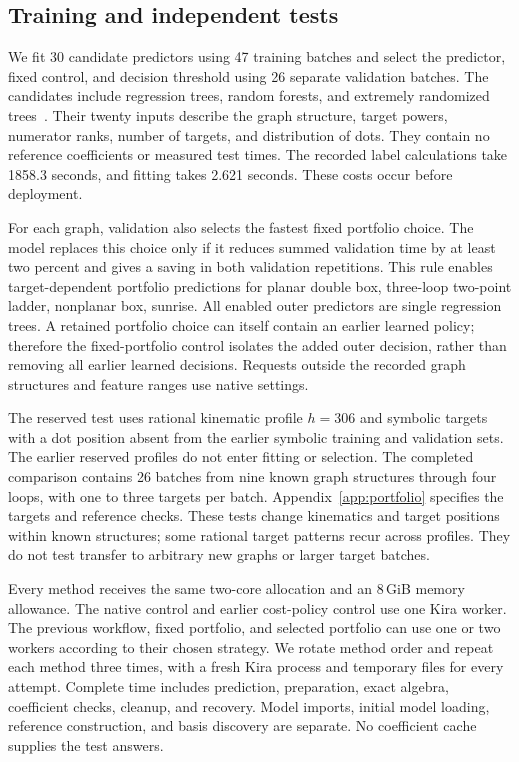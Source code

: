 \subsection{Training and independent tests}
We fit 30 candidate predictors using 47 training batches and select the predictor, fixed control, and decision threshold using 26 separate validation batches. The candidates include regression trees, random forests, and extremely randomized trees~\cite{CART1984,Breiman2001Forest,Geurts2006ExtraTrees}. Their twenty inputs describe the graph structure, target powers, numerator ranks, number of targets, and distribution of dots. They contain no reference coefficients or measured test times. The recorded label calculations take 1858.3 seconds, and fitting takes 2.621 seconds. These costs occur before deployment.

For each graph, validation also selects the fastest fixed portfolio choice. The model replaces this choice only if it reduces summed validation time by at least two percent and gives a saving in both validation repetitions. This rule enables target-dependent portfolio predictions for planar double box, three-loop two-point ladder, nonplanar box, sunrise. All enabled outer predictors are single regression trees. A retained portfolio choice can itself contain an earlier learned policy; therefore the fixed-portfolio control isolates the added outer decision, rather than removing all earlier learned decisions. Requests outside the recorded graph structures and feature ranges use native settings.

The reserved test uses rational kinematic profile $h=306$ and symbolic targets with a dot position absent from the earlier symbolic training and validation sets. The earlier reserved profiles do not enter fitting or selection. The completed comparison contains 26 batches from nine known graph structures through four loops, with one to three targets per batch. Appendix~\ref{app:portfolio} specifies the targets and reference checks. These tests change kinematics and target positions within known structures; some rational target patterns recur across profiles. They do not test transfer to arbitrary new graphs or larger target batches.

Every method receives the same two-core allocation and an 8\,GiB memory allowance. The native control and earlier cost-policy control use one Kira worker. The previous workflow, fixed portfolio, and selected portfolio can use one or two workers according to their chosen strategy. We rotate method order and repeat each method three times, with a fresh Kira process and temporary files for every attempt. Complete time includes prediction, preparation, exact algebra, coefficient checks, cleanup, and recovery. Model imports, initial model loading, reference construction, and basis discovery are separate. No coefficient cache supplies the test answers.

